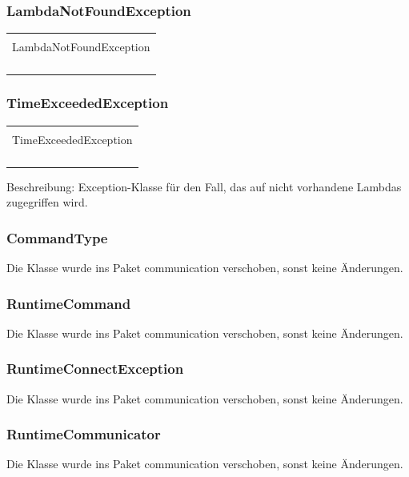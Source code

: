 \documentclass[a4paper,20pt,oneside]{book}
\begin{document}
	\subsubsection{LambdaNotFoundException}
	\centering
	\begin{tabular}{|l|}
	\hline \\
	LambdaNotFoundException \\ \hline \\
	\\ \hline \\
 	\\ \hline
	\end{tabular}
	
	\subsubsection{TimeExceededException}
	\centering
	\begin{tabular}{|l|}
	\hline \\
	TimeExceededException \\ \hline \\
	\\ \hline \\
 	\\ \hline
	\end{tabular}
		 
	\vspace{0.5cm}
	\raggedright
	Beschreibung:
	Exception-Klasse für den Fall, das auf nicht vorhandene Lambdas zugegriffen wird.
	
	
	\subsubsection{CommandType}
	Die Klasse wurde ins Paket communication verschoben, sonst keine Änderungen.
	\subsubsection{RuntimeCommand}
	Die Klasse wurde ins Paket communication verschoben, sonst keine Änderungen.
	\subsubsection{RuntimeConnectException}
	Die Klasse wurde ins Paket communication verschoben, sonst keine Änderungen.
	\subsubsection{RuntimeCommunicator}
	Die Klasse wurde ins Paket communication verschoben, sonst keine Änderungen.
	 
\end{document}

